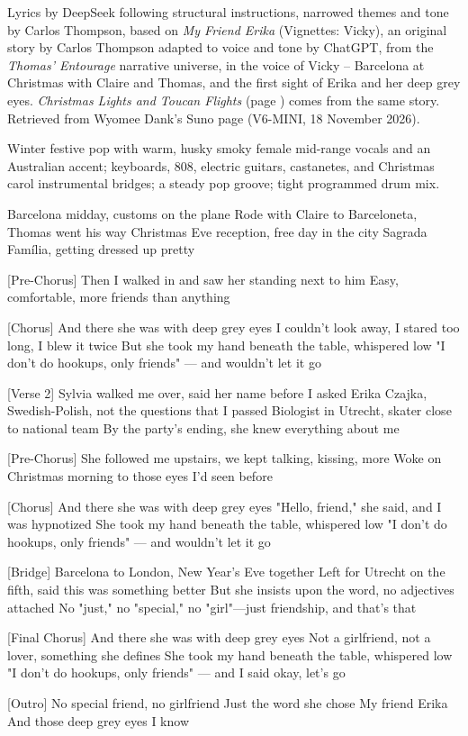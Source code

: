 \label{sec:deep-grey-eyes}
\begin{notes}
Lyrics by DeepSeek following structural instructions, narrowed themes and tone by Carlos Thompson, based on \emph{My Friend Erika} (Vignettes: Vicky), an original story by Carlos Thompson adapted to voice and tone by ChatGPT, from the \emph{Thomas' Entourage} narrative universe, in the voice of Vicky -- Barcelona at Christmas with Claire and Thomas, and the first sight of Erika and her deep grey eyes. \emph{Christmas Lights and Toucan Flights} (page \pageref{sec:christmas-lights-and-toucan-flights}) comes from the same story. Retrieved from Wyomee Dank's Suno page (V6-MINI, 18 November 2026).
\end{notes}
\begin{style}
Winter festive pop with warm, husky smoky female mid-range vocals and an Australian accent; keyboards, 808, electric guitars, castanetes, and Christmas carol instrumental bridges; a steady pop groove; tight programmed drum mix.
\end{style}
\begin{lyrics}
[Verse 1]
Barcelona midday, customs on the plane
Rode with Claire to Barceloneta, Thomas went his way
Christmas Eve reception, free day in the city
Sagrada Família, getting dressed up pretty

[Pre-Chorus]
Then I walked in and saw her standing next to him
Easy, comfortable, more friends than anything

[Chorus]
And there she was with deep grey eyes
I couldn't look away, I stared too long, I blew it twice
But she took my hand beneath the table, whispered low
"I don't do hookups, only friends" — and wouldn't let it go

[Verse 2]
Sylvia walked me over, said her name before I asked
Erika Czajka, Swedish-Polish, not the questions that I passed
Biologist in Utrecht, skater close to national team
By the party's ending, she knew everything about me

[Pre-Chorus]
She followed me upstairs, we kept talking, kissing, more
Woke on Christmas morning to those eyes I'd seen before

[Chorus]
And there she was with deep grey eyes
"Hello, friend," she said, and I was hypnotized
She took my hand beneath the table, whispered low
"I don't do hookups, only friends" — and wouldn't let it go

[Bridge]
Barcelona to London, New Year's Eve together
Left for Utrecht on the fifth, said this was something better
But she insists upon the word, no adjectives attached
No "just," no "special," no "girl"—just friendship, and that's that

[Final Chorus]
And there she was with deep grey eyes
Not a girlfriend, not a lover, something she defines
She took my hand beneath the table, whispered low
"I don't do hookups, only friends" — and I said okay, let's go

[Outro]
No special friend, no girlfriend
Just the word she chose
My friend Erika
And those deep grey eyes I know
\end{lyrics}

